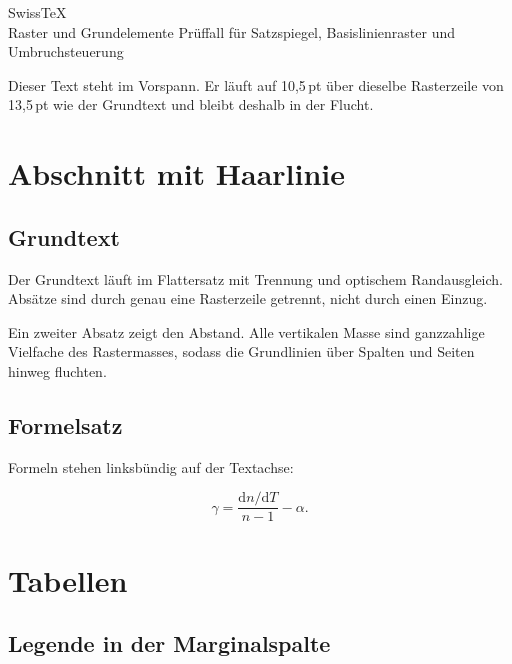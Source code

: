 \documentclass[showgrid=true]{swisstex}
\begin{document}
  {SwissTeX\\Raster und Grundelemente}
  {Prüffall für Satzspiegel, Basislinienraster und Umbruchsteuerung}

\begin{lead}
Dieser Text steht im Vorspann. Er läuft auf 10,5\,pt über dieselbe
Rasterzeile von 13,5\,pt wie der Grundtext und bleibt deshalb in der Flucht.
\end{lead}

\section{Abschnitt mit Haarlinie}

\subsection{Grundtext}

Der Grundtext läuft im Flattersatz mit Trennung und optischem Randausgleich.
Absätze sind durch genau eine Rasterzeile getrennt, nicht durch einen Einzug.

Ein zweiter Absatz zeigt den Abstand. Alle vertikalen Masse sind ganzzahlige
Vielfache des Rastermasses, sodass die Grundlinien über Spalten und Seiten
hinweg fluchten.

\subsection{Formelsatz}

Formeln stehen linksbündig auf der Textachse:

\begin{gridblock}
\begin{equation*}
\gamma=\frac{\mathrm{d}n/\mathrm{d}T}{n-1}-\alpha .
\end{equation*}
\end{gridblock}

\section{Tabellen}

\subsection{Legende in der Marginalspalte}
\end{document}

